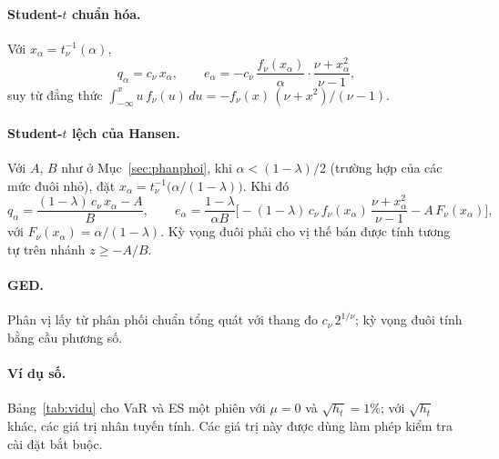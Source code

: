 \documentclass[12pt,a4paper]{article}
\theoremstyle{definition}
\theoremstyle{remark}
\begin{document}
\paragraph{Student-$t$ chuẩn hóa.} Với $x_\alpha=t_\nu^{-1}(\alpha)$,
\begin{equation}
q_\alpha=c_\nu\,x_\alpha,\qquad e_\alpha=-c_\nu\,\frac{f_\nu(x_\alpha)}{\alpha}\cdot\frac{\nu+x_\alpha^2}{\nu-1},
\end{equation}
suy từ đẳng thức $\int_{-\infty}^{x}u\,f_\nu(u)\,du=-f_\nu(x)\,(\nu+x^2)/(\nu-1)$.

\paragraph{Student-$t$ lệch của Hansen.} Với $A$, $B$ như ở Mục~\ref{sec:phanphoi}, khi $\alpha<(1-\lambda)/2$ (trường hợp của các mức đuôi nhỏ), đặt $x_\alpha=t_\nu^{-1}\big(\alpha/(1-\lambda)\big)$. Khi đó
\begin{equation}
q_\alpha=\frac{(1-\lambda)\,c_\nu\,x_\alpha-A}{B},\qquad
e_\alpha=\frac{1-\lambda}{\alpha B}\Big[-(1-\lambda)\,c_\nu\,f_\nu(x_\alpha)\,\frac{\nu+x_\alpha^2}{\nu-1}-A\,F_\nu(x_\alpha)\Big],
\end{equation}
với $F_\nu(x_\alpha)=\alpha/(1-\lambda)$. Kỳ vọng đuôi phải cho vị thế bán được tính tương tự trên nhánh $z\ge-A/B$.

\paragraph{GED.} Phân vị lấy từ phân phối chuẩn tổng quát với thang đo $c_\nu\,2^{1/\nu}$; kỳ vọng đuôi tính bằng cầu phương số.

\paragraph{Ví dụ số.} Bảng~\ref{tab:vidu} cho VaR và ES một phiên với $\mu=0$ và $\sqrt{h_t}=1\%$; với $\sqrt{h_t}$ khác, các giá trị nhân tuyến tính. Các giá trị này được dùng làm phép kiểm tra cài đặt bắt buộc.
\end{document}
